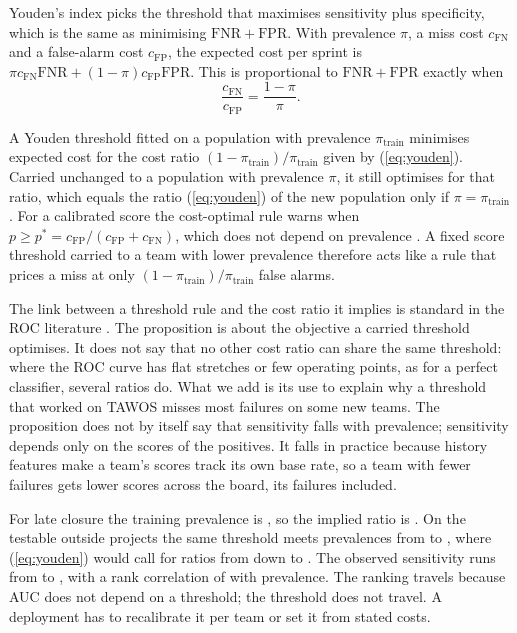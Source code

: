 Youden's index picks the threshold that maximises sensitivity plus specificity, which is the same as minimising $\mathrm{FNR} + \mathrm{FPR}$. With prevalence $\pi$, a miss cost $c_{\mathrm{FN}}$ and a false-alarm cost $c_{\mathrm{FP}}$, the expected cost per sprint is $\pi c_{\mathrm{FN}} \mathrm{FNR} + (1 - \pi) c_{\mathrm{FP}} \mathrm{FPR}$. This is proportional to $\mathrm{FNR} + \mathrm{FPR}$ exactly when
\begin{equation}
\frac{c_{\mathrm{FN}}}{c_{\mathrm{FP}}} = \frac{1 - \pi}{\pi}.
\label{eq:youden}
\end{equation}

\begin{proposition}
\label{prop:youden}
A Youden threshold fitted on a population with prevalence $\pi_{\mathrm{train}}$ minimises expected cost for the cost ratio $(1 - \pi_{\mathrm{train}}) / \pi_{\mathrm{train}}$ given by (\ref{eq:youden}). Carried unchanged to a population with prevalence $\pi$, it still optimises for that ratio, which equals the ratio (\ref{eq:youden}) of the new population only if $\pi = \pi_{\mathrm{train}}$. For a calibrated score the cost-optimal rule warns when $p \ge p^{*} = c_{\mathrm{FP}} / (c_{\mathrm{FP}} + c_{\mathrm{FN}})$, which does not depend on prevalence \cite{elkan2001}. A fixed score threshold carried to a team with lower prevalence therefore acts like a rule that prices a miss at only $(1 - \pi_{\mathrm{train}}) / \pi_{\mathrm{train}}$ false alarms.
\end{proposition}

The link between a threshold rule and the cost ratio it implies is standard in the ROC literature \cite{hernandez2012}. The proposition is about the objective a carried threshold optimises. It does not say that no other cost ratio can share the same threshold: where the ROC curve has flat stretches or few operating points, as for a perfect classifier, several ratios do. What we add is its use to explain why a threshold that worked on TAWOS misses most failures on some new teams. The proposition does not by itself say that sensitivity falls with prevalence; sensitivity depends only on the scores of the positives. It falls in practice because history features make a team's scores track its own base rate, so a team with fewer failures gets lower scores across the board, its failures included.

For late closure the training prevalence is \TrainPrev, so the implied ratio is \TrainRatio. On the \ExtProjects{} testable outside projects the same threshold meets prevalences from \PrevMin{} to \PrevMax, where (\ref{eq:youden}) would call for ratios from \RatioMin{} down to \RatioMax. The observed sensitivity runs from \SensMin{} to \SensMax, with a rank correlation of \SpearmanPS{} with prevalence. The ranking travels because AUC does not depend on a threshold; the threshold does not travel. A deployment has to recalibrate it per team or set it from stated costs.

